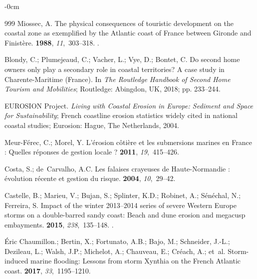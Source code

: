 \documentclass[coasts,article,accept,pdftex,moreauthors]{Definitions/mdpi}
\begin{document}
\begin{adjustwidth}{-\extralength}{0cm}
\begin{thebibliography}{999}
Miossec, A.
\newblock The physical consequences of touristic development on the coastal
  zone as exemplified by the {Atlantic} coast of {France} between {Gironde} and
  {Finist{\`e}re}.
 {\bf 1988}, {\em 11},~303--318.
.

Blondy, C.; Plumejeaud, C.; Vacher, L.; Vye, D.; Bontet, C.
\newblock Do second home owners only play a secondary role in coastal
  territories? A case study in Charente-Maritime (France). In {\em The
  Routledge Handbook of Second Home Tourism and Mobilities}; Routledge: Abingdon, UK, %
  2018;
  pp. 233--244.

{EUROSION Project}.
\newblock \textit{Living with Coastal Erosion in Europe: Sediment and Space for
  Sustainability};  French coastline erosion statistics widely cited in national coastal
  studies; Eurosion: Hague, The Netherlands, 2004. %
\newblock 

Meur-Férec, C.; Morel, Y.
\newblock L’érosion côtière et les submersions marines en France : Quelles
  réponses de gestion locale ?
 {\bf 2011}, {\em 19},~415--426.

Costa, S.; de~Carvalho, A.C.
\newblock Les falaises crayeuses de Haute-Normandie : évolution récente et
  gestion du risque.
 {\bf 2004},
  {\em 10},~29--42.

Castelle, B.; Marieu, V.; Bujan, S.; Splinter, K.D.; Robinet, A.; S\'en\'echal, N.; Ferreira, S.
\newblock Impact of the winter 2013--2014 series of severe {W}estern {E}urope
  storms on a double-barred sandy coast: {B}each and dune erosion and megacusp
  embayments.
 {\bf 2015}, {\em 238},~135--148.
.

Éric Chaumillon.; Bertin, X.;  Fortunato, A.B.; Bajo, M.; Schneider, J.-L.; Dezileau, L.; Walsh, J.P.; Michelot, A.; Chauveau, E.; Créach, A.; et~al.
\newblock Storm-induced marine flooding: Lessons from storm Xynthia on the
  French Atlantic coast.
 {\bf 2017}, {\em 33},~1195--1210.


\end{thebibliography}
\end{adjustwidth}
\end{document}
